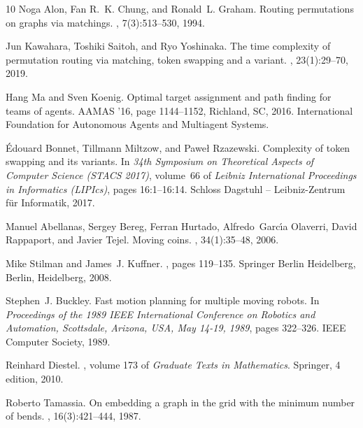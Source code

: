 \documentclass[a4paper,USenglish,thm-restate]{lipics-v2021}
\theoremstyle{problemstyle}
\begin{document}
\begin{thebibliography}{10}
Noga Alon, Fan R.~K. Chung, and Ronald~L. Graham.
\newblock Routing permutations on graphs via matchings.
, 7(3):513--530, 1994.

Jun Kawahara, Toshiki Saitoh, and Ryo Yoshinaka.
\newblock The time complexity of permutation routing via matching, token
  swapping and a variant.
, 23(1):29--70,
  2019.

Hang Ma and Sven Koenig.
\newblock Optimal target assignment and path finding for teams of agents.
\newblock AAMAS '16, page 1144--1152, Richland, SC, 2016. International
  Foundation for Autonomous Agents and Multiagent Systems.

{\'{E}}douard Bonnet, Tillmann Miltzow, and Pawe{\l} Rzazewski.
\newblock Complexity of token swapping and its variants.
\newblock In {\em 34th Symposium on Theoretical Aspects of Computer Science
  (STACS 2017)}, volume~66 of {\em Leibniz International Proceedings in
  Informatics (LIPIcs)}, pages 16:1--16:14. Schloss Dagstuhl -- Leibniz-Zentrum
  f{\"u}r Informatik, 2017.

Manuel Abellanas, Sergey Bereg, Ferran Hurtado, Alfredo~Garc{\'{\i}}a Olaverri,
  David Rappaport, and Javier Tejel.
\newblock Moving coins.
, 34(1):35--48, 2006.

Mike Stilman and James~J. Kuffner.
,
  pages 119--135.
\newblock Springer Berlin Heidelberg, Berlin, Heidelberg, 2008.

Stephen~J. Buckley.
\newblock Fast motion planning for multiple moving robots.
\newblock In {\em Proceedings of the 1989 {IEEE} International Conference on
  Robotics and Automation, Scottsdale, Arizona, USA, May 14-19, 1989}, pages
  322--326. {IEEE} Computer Society, 1989.

Reinhard Diestel.
, volume 173 of {\em Graduate Texts in
  Mathematics}.
\newblock Springer, 4 edition, 2010.

Roberto Tamassia.
\newblock On embedding a graph in the grid with the minimum number of bends.
, 16(3):421--444, 1987.


\end{thebibliography}
\end{document}
